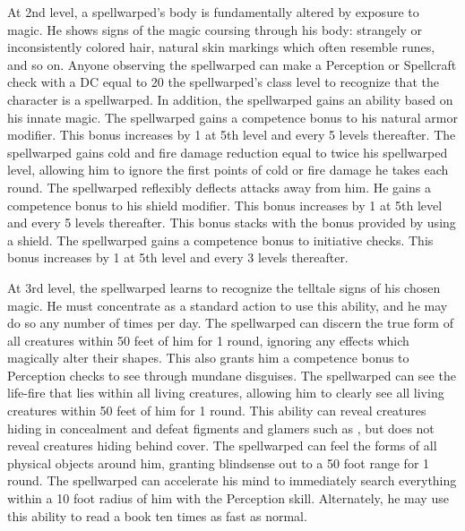  At 2nd level, a spellwarped's body is fundamentally altered by exposure to magic. He shows signs of the magic coursing through his body: strangely or inconsistently colored hair, natural skin markings which often resemble runes, and so on. Anyone observing the spellwarped can make a Perception or Spellcraft check with a DC equal to 20 \sub the spellwarped's class level to recognize that the character is a spellwarped. In addition, the spellwarped gains an ability based on his innate magic.
 The spellwarped gains a  competence bonus to his natural armor modifier. This bonus increases by 1 at 5th level and every 5 levels thereafter.
 The spellwarped gains cold and fire damage reduction equal to twice his spellwarped level, allowing him to ignore the first points of cold or fire damage he takes each round.
 The spellwarped reflexibly deflects attacks away from him. He gains a  competence bonus to his shield modifier. This bonus increases by 1 at 5th level and every 5 levels thereafter. This bonus stacks with the bonus provided by using a shield.
 The spellwarped gains a  competence bonus to initiative checks. This bonus increases by 1 at 5th level and every 3 levels thereafter.

 At 3rd level, the spellwarped learns to recognize the telltale signs of his chosen magic. He must concentrate as a standard action to use this ability, and he may do so any number of times per day.
 The spellwarped can discern the true form of all creatures within 50 feet of him for 1 round, ignoring any effects which magically alter their shapes. This also grants him a  competence bonus to Perception checks to see through mundane disguises.
 The spellwarped can see the life-fire that lies within all living creatures, allowing him to clearly see all living creatures within 50 feet of him for 1 round. This ability can reveal creatures hiding in concealment and defeat figments and glamers such as , but does not reveal creatures hiding behind cover.
 The spellwarped can feel the forms of all physical objects around him, granting blindsense out to a 50 foot range for 1 round.
 The spellwarped can accelerate his mind to immediately search everything within a 10 foot radius of him with the Perception skill. Alternately, he may use this ability to read a book ten times as fast as normal.

